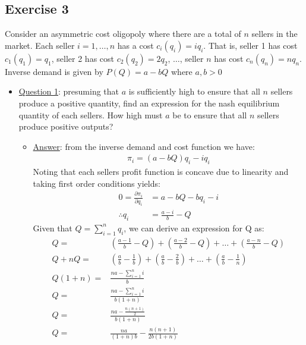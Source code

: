 \documentclass{article}
\begin{document}
\subsection{Exercise 3}
Consider an asymmetric cost oligopoly where there are a total of $n$ sellers in the market. Each seller $i = 1, \dots, n$ has a cost $c_{i}(q_{i}) = iq_{i}$. That is, seller 1 has cost $c_{1}(q_{1}) = q_{1}$, seller 2 has cost $c_{2}(q_{2}) = 2q_{2}$, $\dots$, seller $n$ has cost $c_{n}(q_{n}) = nq_{n}$. Inverse demand is given by $P(Q) = a - bQ$ where $a,b > 0 $\par \vspace{0.3em}
  \begin{itemize}
    \item  \underline{Question 1}: presuming that $a$ is sufficiently high to ensure that all $n$ sellers produce a positive quantity, find an expression for the nash equilibrium quantity of each sellers. How high must $a$ be to ensure that all $n$ sellers produce positive outputs?
    \begin{itemize}
      \item  \underline{Answer}: from the inverse demand and cost function we have:
      \begin{gather*}
        \pi_{i} = (a-bQ)q_{i} - iq_{i}
      \end{gather*}
      Noting that each sellers profit function is concave due to linearity and taking first order conditions yields:
      \begin{align*}
        0 = \frac{\partial \pi_{i}}{\partial q_{i}} &= a - bQ - bq_{i} - i \\
        \therefore q_{i} &= \frac{a-i}{b} - Q \ \tag{1}
      \end{align*}
      Given that $Q = \sum_{i=1}^{n} q_{i}$, we can derive an expression for Q as:
      \begin{align*}
        Q =& (\frac{a - 1}{b} - Q) + (\frac{a - 2}{b} - Q) + \dots + (\frac{a - n}{b} - Q) \\
        Q + nQ =& (\frac{a}{b} - \frac{1}{b}) + (\frac{a}{b} - \frac{2}{b}) + \dots + (\frac{a}{b} - \frac{1}{n}) \\
        Q(1 + n) =& \frac{na - \sum_{i=1}^{n}i}{b} \\
        Q =& \frac{na - \sum_{i=1}^{n}i}{b(1+n)} \\
        Q =& \frac{na - \tfrac{n(n+1)}{2}}{b(1+n)} \\
        Q =& \frac{na}{(1+n)b} - \frac{n(n+1)}{2b(1+n)} \\

\end{align*}
\end{itemize}
\end{itemize}
\end{document}
